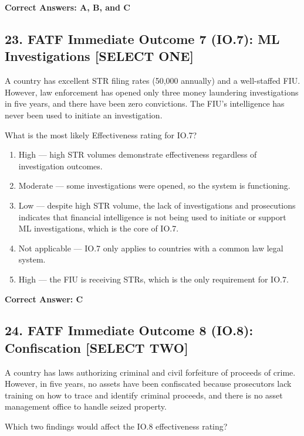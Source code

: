 \documentclass[11pt,a4paper]{article}
\begin{document}
	\textbf{Correct Answers: A, B, and C}
	
	\subsection{23. FATF Immediate Outcome 7 (IO.7): ML Investigations \textnormal{[SELECT ONE]}}
	
	A country has excellent STR filing rates (50,000 annually) and a well-staffed FIU. However, law enforcement has opened only three money laundering investigations in five years, and there have been zero convictions. The FIU's intelligence has never been used to initiate an investigation.
	
	What is the most likely Effectiveness rating for IO.7?
	
	\begin{enumerate}[label=\Alph*.]
		\item High — high STR volumes demonstrate effectiveness regardless of investigation outcomes.
		\item Moderate — some investigations were opened, so the system is functioning.
		\item Low — despite high STR volume, the lack of investigations and prosecutions indicates that financial intelligence is not being used to initiate or support ML investigations, which is the core of IO.7.
		\item Not applicable — IO.7 only applies to countries with a common law legal system.
		\item High — the FIU is receiving STRs, which is the only requirement for IO.7.
	\end{enumerate}
	
	\textbf{Correct Answer: C}
	
	\subsection{24. FATF Immediate Outcome 8 (IO.8): Confiscation \textnormal{[SELECT TWO]}}
	
	A country has laws authorizing criminal and civil forfeiture of proceeds of crime. However, in five years, no assets have been confiscated because prosecutors lack training on how to trace and identify criminal proceeds, and there is no asset management office to handle seized property.
	
	Which two findings would affect the IO.8 effectiveness rating?
	
\end{document}
